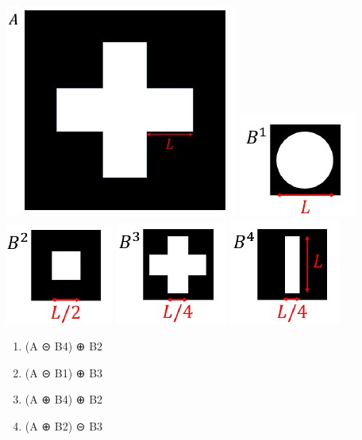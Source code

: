 \documentclass[11pt]{article}
\makeatletter
\def\maxwidth{\ifdim\Gin@nat@width>\linewidth\linewidth
    \else\Gin@nat@width\fi}
\let\Oldincludegraphics\includegraphics
\renewcommand{\includegraphics}[1]{\Oldincludegraphics[width=.8\maxwidth]{#1}}
\providecommand{\tightlist}{%
      \setlength{\itemsep}{0pt}\setlength{\parskip}{0pt}}
\makeatother
\begin{document}
\includegraphics{wiki/2_1.jpg} \includegraphics{wiki/2_2.jpg}
\includegraphics{wiki/2_3.jpg} \includegraphics{wiki/2_4.jpg}
\includegraphics{wiki/2_5.jpg}

\begin{enumerate}
\def\labelenumi{\arabic{enumi}.}
\tightlist
\item
  (A ⊝ B4) ⊕ B2
\item
  (A ⊝ B1) ⊕ B3
\item
  (A ⊕ B4) ⊕ B2
\item
  (A ⊕ B2) ⊝ B3
\end{enumerate}
\end{document}
